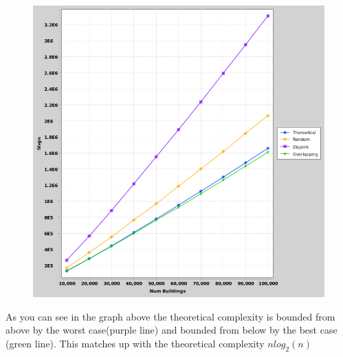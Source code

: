 \documentclass{article}
\begin{document}
		\begin{figure}[h]
			\vspace{3mm}
			\begin{center}
				\includegraphics[scale=0.4]{data.png}
			\end{center}
		\end{figure}
		
		As you can see in the graph above the theoretical complexity is bounded from above by the worst case(purple line) and bounded from below by the best case (green line). This matches up with the theoretical complexity $nlog_2(n)$
  
\end{document}
